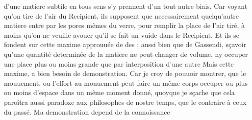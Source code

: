 d'une matiere subtile\protect{} en tous sens s'y prennent d'un tout autre biais. Car voyant qu'on tire de l'air du Recipient, ils supposent que necessairement quelqu'autre matiere entre par les pores mêmes du verre, pour remplir la place de l'air tir\'{e}, \`{a} moins qu'on ne veuille avouer qu'il se fait un vuide dans le Recipient. Et ils se fondent sur cette maxime approuu\'{e}e de des ; aussi bien que de Gassendi\protect{}, s\c{c}avoir qu'une quantit\'{e} determin\'{e}e de la matiere ne peut changer de volume, ny occuper une place plus ou moins grande que par interposition d'une autre  Mais cette maxime, a bien besoin de demonstration. Car je croy de pouuoir montrer, que le mouuement, ou l'effort au mouuement peut faire un même corps\protect{} occuper ou plus ou moins d'espace dans un même moment donn\'{e}, quoyque je s\c{c}ache que cela paroîtra aussi paradoxe aux philosophes de nostre temps, que le contraire \`{a} ceux du pass\'{e}. \normalsize Ma demonstration depend de la connoissance 